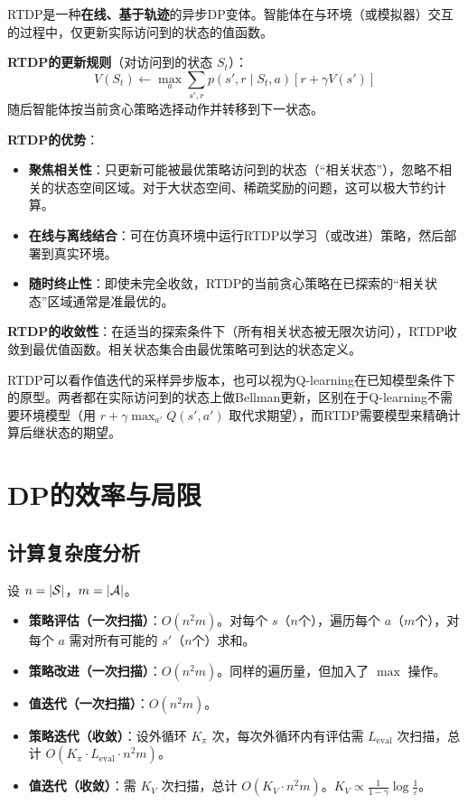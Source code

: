 RTDP是一种\textbf{在线、基于轨迹}的异步DP变体。智能体在与环境（或模拟器）交互的过程中，仅更新实际访问到的状态的值函数。

\textbf{RTDP的更新规则}（对访问到的状态 $S_t$）：
\[
V(S_t) \leftarrow \max_a \sum_{s', r} p(s', r \mid S_t, a) [r + \gamma V(s')]
\]
随后智能体按当前贪心策略选择动作并转移到下一状态。

\textbf{RTDP的优势}：
\begin{itemize}
    \item \textbf{聚焦相关性}：只更新可能被最优策略访问到的状态（``相关状态''），忽略不相关的状态空间区域。对于大状态空间、稀疏奖励的问题，这可以极大节约计算。
    \item \textbf{在线与离线结合}：可在仿真环境中运行RTDP以学习（或改进）策略，然后部署到真实环境。
    \item \textbf{随时终止性}：即使未完全收敛，RTDP的当前贪心策略在已探索的``相关状态''区域通常是准最优的。
\end{itemize}

\textbf{RTDP的收敛性}：在适当的探索条件下（所有相关状态被无限次访问），RTDP收敛到最优值函数。相关状态集合由最优策略可到达的状态定义。

RTDP可以看作值迭代的采样异步版本，也可以视为Q-learning在已知模型条件下的原型。两者都在实际访问到的状态上做Bellman更新，区别在于Q-learning不需要环境模型（用 $r + \gamma \max_{a'} Q(s', a')$ 取代求期望），而RTDP需要模型来精确计算后继状态的期望。

\section{DP的效率与局限}

\subsection{计算复杂度分析}

设 $n = |\mathcal{S}|$，$m = |\mathcal{A}|$。

\begin{itemize}
    \item \textbf{策略评估（一次扫描）}：$O(n^2 m)$。对每个 $s$（$n$个），遍历每个 $a$（$m$个），对每个 $a$ 需对所有可能的 $s'$（$n$个）求和。
    \item \textbf{策略改进（一次扫描）}：$O(n^2 m)$。同样的遍历量，但加入了 $\max$ 操作。
    \item \textbf{值迭代（一次扫描）}：$O(n^2 m)$。
    \item \textbf{策略迭代（收敛）}：设外循环 $K_{\pi}$ 次，每次外循环内有评估需 $L_{\text{eval}}$ 次扫描，总计 $O(K_{\pi} \cdot L_{\text{eval}} \cdot n^2 m)$。
    \item \textbf{值迭代（收敛）}：需 $K_V$ 次扫描，总计 $O(K_V \cdot n^2 m)$。$K_V \propto \frac{1}{1-\gamma} \log \frac{1}{\varepsilon}$。
\end{itemize}

